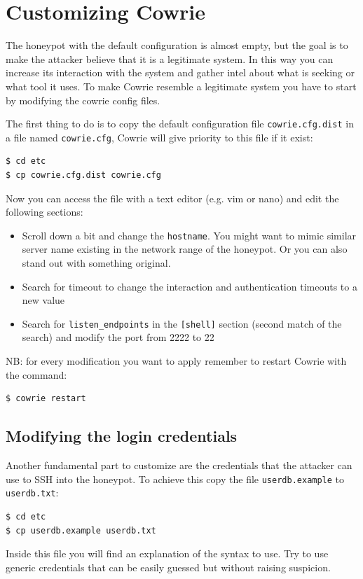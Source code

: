\documentclass[epsfig,a4paper,11pt,titlepage,oneside,openany]{book}
\begin{document}
\section{Customizing Cowrie}
The honeypot with the default configuration is almost empty, but the goal is to make the attacker believe that it is a legitimate system. In this way you can increase its interaction with the system and gather intel about what is seeking or what tool it uses. To make Cowrie resemble a legitimate system you have to start by modifying the cowrie config files.

The first thing to do is to copy the default configuration file \texttt{cowrie.cfg.dist} in a file named \texttt{cowrie.cfg}, Cowrie will give priority to this file if it exist:
\begin{lstlisting}[language=bash]
$ cd etc
$ cp cowrie.cfg.dist cowrie.cfg
\end{lstlisting}
Now you can access the file with a text editor (e.g. vim or nano) and edit the following sections:
\begin{itemize}
\item Scroll down a bit and change the \texttt{hostname}. You might want to mimic similar server name existing in the network range of the honeypot. Or you can also stand out with something original.
\item Search for timeout to change the interaction and authentication timeouts to a new value
\item Search for \texttt{listen\_endpoints} in the \texttt{[shell]} section (second match of the search) and modify the port from 2222 to 22
\end{itemize}

\noindent NB: for every modification you want to apply remember to restart Cowrie with the command:

\begin{lstlisting}[language=bash]
$ cowrie restart
\end{lstlisting}

\subsection{Modifying the login credentials}
\label{sub:login}
Another fundamental part to customize are the credentials that the attacker can use to SSH into the honeypot. To achieve this copy the file \texttt{userdb.example} to \texttt{userdb.txt}:
\begin{lstlisting}[language=bash]
$ cd etc
$ cp userdb.example userdb.txt
\end{lstlisting}
Inside this file you will find an explanation of the syntax to use.
Try to use generic credentials that can be easily guessed but without raising suspicion.
\end{document}
